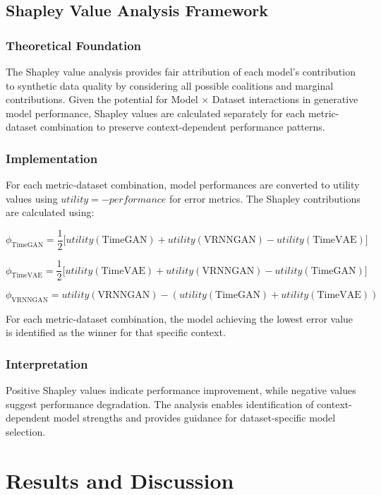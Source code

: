 \documentclass{article}
\begin{document}
\subsection{Shapley Value Analysis Framework}

\subsubsection{Theoretical Foundation}
The Shapley value analysis provides fair attribution of each model's contribution to synthetic data quality by considering all possible coalitions and marginal contributions. Given the potential for Model × Dataset interactions in generative model performance, Shapley values are calculated separately for each metric-dataset combination to preserve context-dependent performance patterns.

\subsubsection{Implementation}
For each metric-dataset combination, model performances are converted to utility values using $utility = -performance$ for error metrics. The Shapley contributions are calculated using:

\[
\phi_{\text{TimeGAN}} = \frac{1}{2} \big[utility(\text{TimeGAN}) + utility(\text{VRNNGAN}) - utility(\text{TimeVAE})\big]
\]

\[
\phi_{\text{TimeVAE}} = \frac{1}{2} \big[utility(\text{TimeVAE}) + utility(\text{VRNNGAN}) - utility(\text{TimeGAN})\big]
\]

\[
\phi_{\text{VRNNGAN}} = utility(\text{VRNNGAN}) - (utility(\text{TimeGAN}) + utility(\text{TimeVAE}))
\]

For each metric-dataset combination, the model achieving the lowest error value is identified as the winner for that specific context.

\subsubsection{Interpretation}
Positive Shapley values indicate performance improvement, while negative values suggest performance degradation. The analysis enables identification of context-dependent model strengths and provides guidance for dataset-specific model selection.


\newpage

\section{Results and Discussion}
\end{document}
